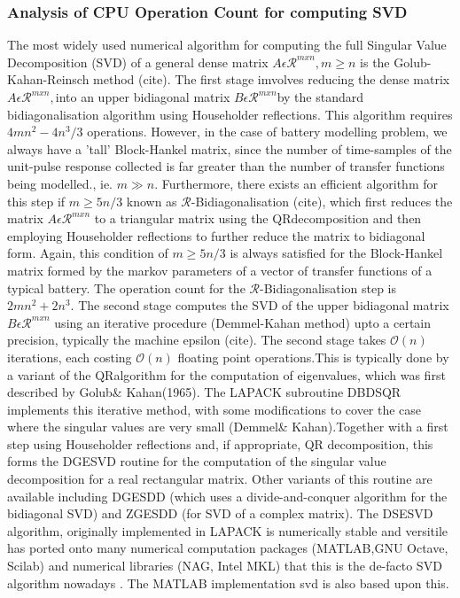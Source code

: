 \subsubsection*{Analysis of CPU Operation Count for computing SVD}

The most widely  used numerical algorithm for computing the  full Singular Value
Decomposition (SVD) of a  general dense matrix $A\epsilon\mathcal{R}^{mxn},m\geq
n$ is the  Golub-Kahan-Reinsch method (cite). The first  stage imvolves reducing
the dense  matrix $A\epsilon\mathcal{R}^{mxn},$into  an upper  bidiagonal matrix
$B\epsilon\mathcal{R}^{mxn}$by  the standard  bidiagonalisation algorithm  using
Householder reflections. This  algorithm requires $4mn^{2}-4n^{3}/3$ operations.
However,  in the  case of  battery modelling  problem, we  always have  a 'tall'
Block-Hankel matrix, since the number of time-samples of the unit-pulse response
collected is far greater than the  number of transfer functions being modelled.,
ie.  $m\gg  n$.  Furthermore,  there  exists an  efficient  algorithm  for  this
step  if  $m\geq5n/3$  known as  $\mathcal{R}$-Bidiagonalisation  (cite),  which
first  reduces the  matrix $A\epsilon\mathcal{R}^{mxn}$  to a  triangular matrix
using  the QR\LyXFourPerEmSpace  decomposition  and  then employing  Householder
reflections  to  further reduce  the  matrix  to  bidiagonal form.  Again,  this
condition  of  $m\geq5n/3$  is  always satisfied  for  the  Block-Hankel  matrix
formed  by  the  markov parameters  of  a  vector  of  transfer functions  of  a
typical  battery. The  operation count  for the  $\mathcal{R}$-Bidiagonalisation
step  is $2mn^{2}+2n^{3}$.  The  second  stage computes  the  SVD  of the  upper
bidiagonal  matrix  $B\epsilon\mathcal{R}^{mxn}$  using an  iterative  procedure
(Demmel-Kahan method)  upto a certain  precision, typically the  machine epsilon
(cite).  The   second  stage  takes  $\mathcal{O}(n)$iterations,   each  costing
$\mathcal{O}(n)$ floating point  operations.This is typically done  by a variant
of  the  QR\LyXFourPerEmSpace  algorithm  for the  computation  of  eigenvalues,
which  was  first   described  by  Golub\LyXFourPerEmSpace  \&\LyXFourPerEmSpace
Kahan\LyXFourPerEmSpace  (1965). The  LAPACK subroutine  DBDSQR implements  this
iterative  method,  with  some  modifications   to  cover  the  case  where  the
singular  values are  very small  (Demmel\LyXFourPerEmSpace \&\LyXFourPerEmSpace
Kahan).Together  with  a first  step  using  Householder
reflections and, if appropriate, QR decomposition, this forms the DGESVD routine
for the computation  of the singular value decomposition for  a real rectangular
matrix. Other  variants of  this routine are  available including  DGESDD (which
uses a divide-and-conquer algorithm for the  bidiagonal SVD) and ZGESDD (for SVD
of a complex matrix). The DSESVD  algorithm, originally implemented in LAPACK is
numerically  stable and  versitile has  ported onto  many numerical  computation
packages (MATLAB,GNU  Octave, Scilab) and  numerical libraries (NAG,  Intel MKL)
that this is the de-facto SVD algorithm nowadays . The MATLAB implementation svd
is also based upon this.

